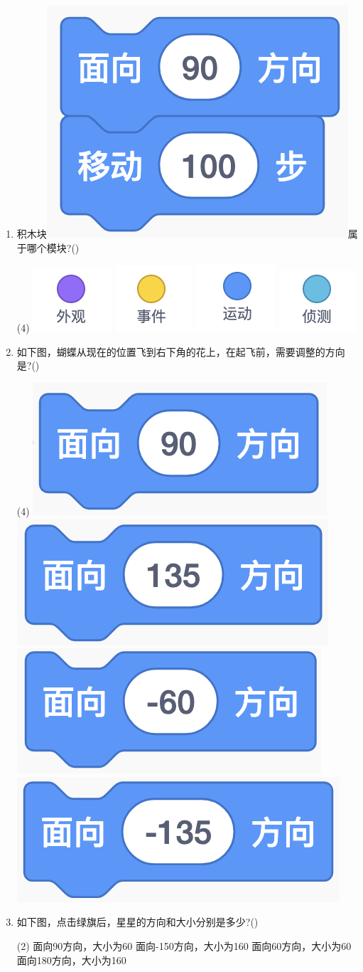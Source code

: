 \documentclass[10pt, a4paper]{article}
\begin{document}
\begin{enumerate}
        \item 积木块\includegraphics[width=.08\textwidth]{12.png}属于哪个模块?(\qquad)
        \begin{tasks}(4)
            \task \includegraphics[width=.06\textwidth]{12a.png}
            \task \includegraphics[width=.06\textwidth]{12b.png}
            \task \includegraphics[width=.06\textwidth]{12c.png}
            \task \includegraphics[width=.06\textwidth]{12d.png}
        \end{tasks}

        \newpage
        \item 如下图，蝴蝶从现在的位置飞到右下角的花上，在起飞前，需要调整的方向是?(\qquad)
        \begin{tasks}(4)
            \task \includegraphics[width=.1\textwidth]{13a.png}
            \task \includegraphics[width=.1\textwidth]{13b.png}
            \task \includegraphics[width=.1\textwidth]{13c.png}
            \task \includegraphics[width=.1\textwidth]{13d.png}
        \end{tasks}

        \item 如下图，点击绿旗后，星星的方向和大小分别是多少?(\qquad)
        \begin{tasks}(2)
            \task 面向90方向，大小为60
            \task 面向-150方向，大小为160
            \task 面向60方向，大小为60
            \task 面向180方向，大小为160
        \end{tasks}


\end{enumerate}
\end{document}
